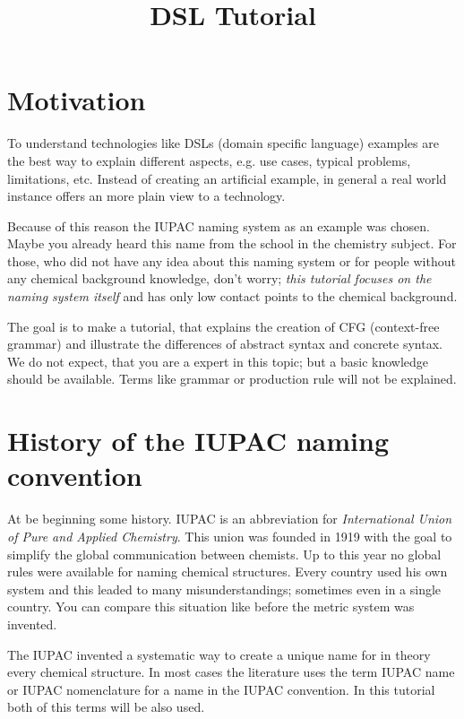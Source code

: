 \documentclass[a4paper,10pt]{article}
\title{DSL Tutorial}
\author{}
\newcommand{\gerquot}[1]{\glqq#1\grqq}
\newcommand{\dashAndSpace}{\textendash \space}
\newcommand{\dashAndSpaceSeq}[1]{\dashAndSpace#1 \textendash}
\newcommand{\DSL}{domain specific language}
\newcommand{\CFG}{context-free grammar}
\newcommand{\IUPAC}{International Union of Pure and Applied Chemistry}
\begin{document}
\maketitle

\section{Motivation}\label{s:Motivation}
To understand technologies like DSLs (\DSL) examples are the best way to explain different aspects, e.g. use cases, typical problems, limitations, etc. Instead of creating an artificial example, in general a real world instance offers an more plain view to a technology.

Because of this reason the IUPAC naming system as an example was chosen. Maybe you already heard this name from the school in the chemistry subject. For those, who did not have any idea about this naming system or for people without any chemical background knowledge, don't worry; \emph{this tutorial focuses on the naming system itself} and has only low contact points to the chemical background.

The goal is to make a tutorial, that explains the creation of CFG (\CFG) and illustrate the differences of abstract syntax and concrete syntax. We do not expect, that you are a expert in this topic; but a basic knowledge should be available. Terms like \gerquot{grammar} or \gerquot{production rule} will not be explained.



\section{History of the IUPAC naming convention}\label{s:HistoryOfTheIUPACNamingConvention}
At be beginning some history. IUPAC is an abbreviation for \emph{\IUPAC}. This union was founded in 1919 with the goal to simplify the global communication between chemists. Up to this year no global rules were available for naming chemical structures. Every country used his own system and this leaded to many misunderstandings; sometimes even in a single country. You can compare this situation like before the metric system was invented.

The IUPAC invented a systematic way to create a unique name for \dashAndSpaceSeq{in theory} every chemical structure. In most cases the literature uses the term \gerquot{IUPAC name} or \gerquot{IUPAC nomenclature} for a name in the IUPAC convention. In this tutorial both of this terms will be also used.
\end{document}
